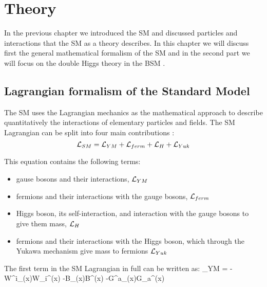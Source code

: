 
\chapter{Theory}
\label{ch:theory}

In the previous chapter we introduced the SM and discussed particles and interactions that the SM as a theory describes. In this chapter we will discuss first the general mathematical formalism of the SM and in the second part we will focus on the double Higgs theory in the BSM	.


\section{Lagrangian formalism of the Standard Model}
The SM uses the Lagrangian mechanics as the mathematical approach to describe quantitatively the interactions of elementary particles and fields. 
The SM Lagrangian can be split into four main contributions \cite{Mozer:2016wzi}:
\begin{equation}\label{lagr_SM}
\mathcal{L}_{SM} = \mathcal{L}_{YM} + \mathcal{L}_{ferm} + \mathcal{L}_{H} + \mathcal{L}_{Yuk} 
\end{equation}

This equation contains the following terms:

\begin{itemize}
\item gause bosons and their interactions, $\mathcal{L}_{YM} $
\item fermions and their interactions with the gauge bosons, $\mathcal{L}_{ferm}$
\item Higgs boson, its self-interaction, and interaction with the gauge bosons to give them mass, $\mathcal{L}_{H}$%
\item fermions and their interactions with the Higgs boson, which through the Yukawa mechanism give mass to fermions $\mathcal{L}_{Yuk} $
\end{itemize}
 


The first term in the SM Lagrangian in full can be written as:
\beqn\label{lagr_YM}
\Lagr_{YM} = 	-W^i_{\mu\nu}(x)W_i^{\mu\nu}(x) -B_{\mu\nu}(x)B^{\mu\nu}(x) -G^a_{\mu\nu}(x)G_a^{\mu\nu}(x)
\eeqn

